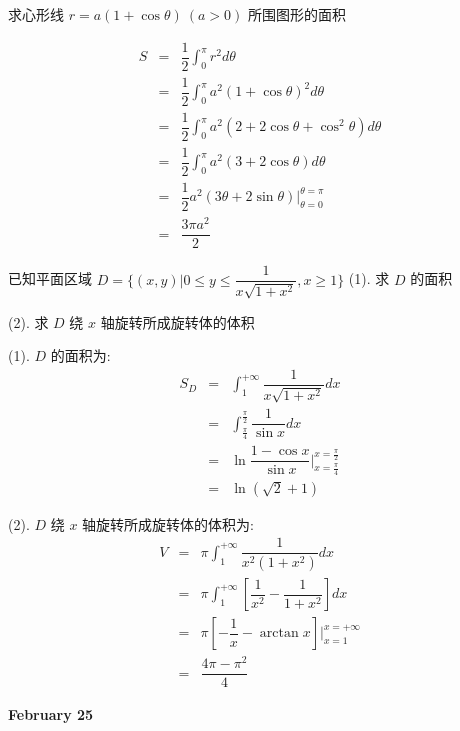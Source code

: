 \begin{example}[][Exam: 28.4.5]
	求心形线 $r=a(1+\cos\theta)\ (a>0)$ 所围图形的面积
\end{example}
\begin{solution}
	\begin{eqnarray*}
		S & = & \dfrac{1}{2}\int_{0}^{\pi}r^{2}d\theta\\
		  & = & \dfrac{1}{2}\int_{0}^{\pi}a^{2}(1+\cos\theta)^{2}d\theta\\
		  & = & \dfrac{1}{2}\int_{0}^{\pi}a^{2}(2+2\cos\theta+\cos^{2}\theta)d\theta\\
		  & = & \dfrac{1}{2}\int_{0}^{\pi}a^{2}(3+2\cos\theta)d\theta\\
		  & = & \dfrac{1}{2}a^{2}(3\theta+2\sin\theta)\big|_{\theta=0}^{\theta=\pi}\\
		  & = & \dfrac{3\pi a^{2}}{2}
	\end{eqnarray*}	
\end{solution}
\begin{example}[][Exam: 28.4.6]
	已知平面区域 $D=\{(x,y)|0\leq y\leq \dfrac{1}{x\sqrt{1+x^{2}}},x\geq 1\}$
(1). 求 $D$ 的面积

(2). 求 $D$ 绕 $x$ 轴旋转所成旋转体的体积
\end{example}
\begin{solution}

(1). $D$ 的面积为:
	\begin{eqnarray*}
		S_{D} & = & \int_{1}^{+\infty}\dfrac{1}{x\sqrt{1+x^{2}}}dx\\
			  & = & \int_{\frac{\pi}{4}}^{\frac{\pi}{2}}\dfrac{1}{\sin x}dx\\
			  & = & \ln \dfrac{1-\cos x}{\sin x}\big|_{x=\frac{\pi}{4}}^{x=\frac{\pi}{2}}\\
			  & = & \ln (\sqrt{2} + 1)
	\end{eqnarray*}

(2). $D$ 绕 $x$ 轴旋转所成旋转体的体积为:
	\begin{eqnarray*}
		V & = & \pi\int_{1}^{+\infty}\dfrac{1}{x^{2}(1+x^{2})}dx\\
		  & = & \pi\int_{1}^{+\infty}\left[\dfrac{1}{x^{2}}-\dfrac{1}{1+x^{2}}\right]dx\\
		  & = & \pi\left[-\dfrac{1}{x}-\arctan x\right]\big|_{x=1}^{x=+\infty}\\
		  & = & \dfrac{4\pi-\pi^{2}}{4}
	\end{eqnarray*}
\end{solution}

\textcolor{purplea}{\textbf{February 25}}

